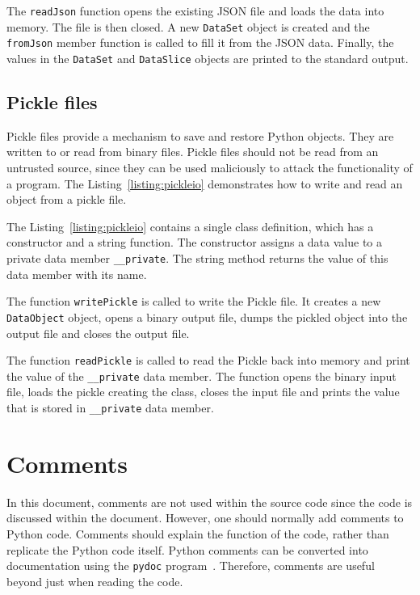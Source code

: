 \documentclass[11pt,a4paper]{article}
\begin{document}
The \texttt{readJson} function opens the existing JSON file and loads the data into memory.  The file is then closed.  A new \texttt{DataSet} object is created and the \texttt{fromJson} member function is called to fill it from the JSON data.  Finally, the values in the \texttt{DataSet} and \texttt{DataSlice} objects are printed to the standard output.

\subsection{Pickle files}

Pickle files provide a mechanism to save and restore Python objects.  They are written to or read from binary files.  Pickle files should not be read from an untrusted source, since they can be used maliciously to attack the functionality of a program.  The Listing~\ref{listing:pickleio} demonstrates how to write and read an object from a pickle file.



The Listing~\ref{listing:pickleio} contains a single class definition, which has a constructor and a string function.  The constructor assigns a data value to a private data member \texttt{\_\_private}.  The string method returns the value of this data member with its name.

The function \texttt{writePickle} is called to write the Pickle file.  It creates a new \texttt{DataObject} object, opens a binary output file, dumps the pickled object into the output file and closes the output file.

The function \texttt{readPickle} is called to read the Pickle back into memory and print the value of the \texttt{\_\_private} data member.  The function opens the binary input file, loads the pickle creating the class, closes the input file and prints the value that is stored in \texttt{\_\_private} data member.

\section{Comments \label{section:comments}}

In this document, comments are not used within the source code since the code is discussed within the document.  However, one should normally add comments to Python code.  Comments should explain the function of the code, rather than replicate the Python code itself.  Python comments can be converted into documentation using the \texttt{pydoc} program~\cite{pydoc}.  Therefore, comments are useful beyond just when reading the code.
\end{document}
